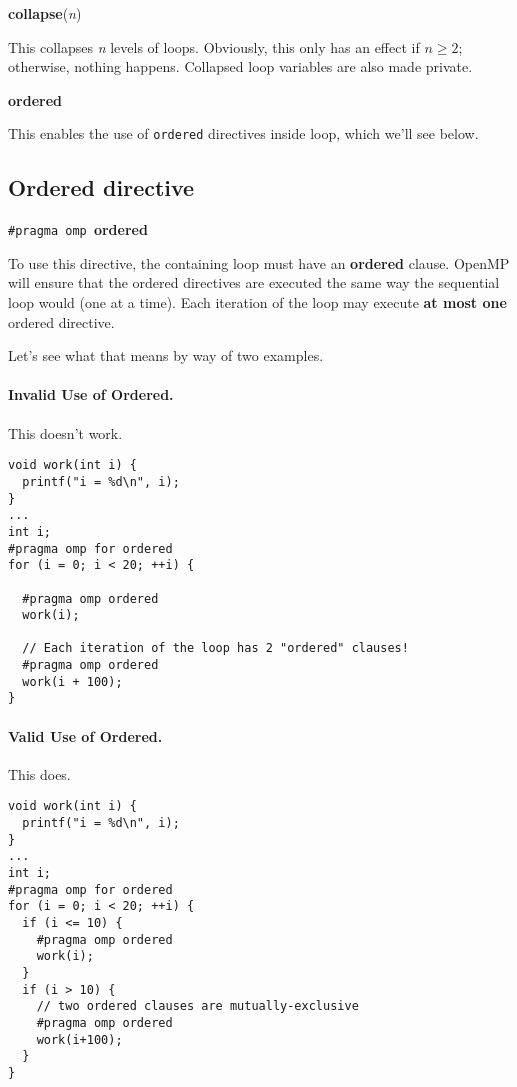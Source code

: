   \begin{center}
    {\bf collapse}({\it n})
  \end{center}

    This collapses {\it n} levels of loops. Obviously, this only has
    an effect if $n \ge 2$; otherwise, nothing happens. Collapsed loop
    variables are also made private.

  \begin{center}
    {\bf ordered}
  \end{center}
  
    This enables the use of {\tt ordered} directives inside loop, which we'll see below.

\subsection*{Ordered directive}
  \begin{center}
    {\tt \#pragma omp }{\bf ordered}
  \end{center}

    To use this directive, the containing loop must have an {\bf ordered} clause.
    OpenMP will ensure that the ordered directives are executed the same
      way the sequential loop would (one at a time).
    Each iteration of the loop may execute {\bf at most one} ordered
      directive.

Let's see what that means by way of two examples.

\paragraph{Invalid Use of Ordered.} This doesn't work.

{\small
  \begin{lstlisting}
void work(int i) {
  printf("i = %d\n", i);
}
...
int i;
#pragma omp for ordered
for (i = 0; i < 20; ++i) {

  #pragma omp ordered
  work(i);

  // Each iteration of the loop has 2 "ordered" clauses!
  #pragma omp ordered 
  work(i + 100);
}
  \end{lstlisting}
}

\paragraph{Valid Use of Ordered.} This does.
{\small  \begin{lstlisting}
void work(int i) {
  printf("i = %d\n", i);
}
...
int i;
#pragma omp for ordered
for (i = 0; i < 20; ++i) {
  if (i <= 10) {
    #pragma omp ordered
    work(i);
  }
  if (i > 10) {
    // two ordered clauses are mutually-exclusive
    #pragma omp ordered
    work(i+100);
  }
}
  \end{lstlisting}
}

